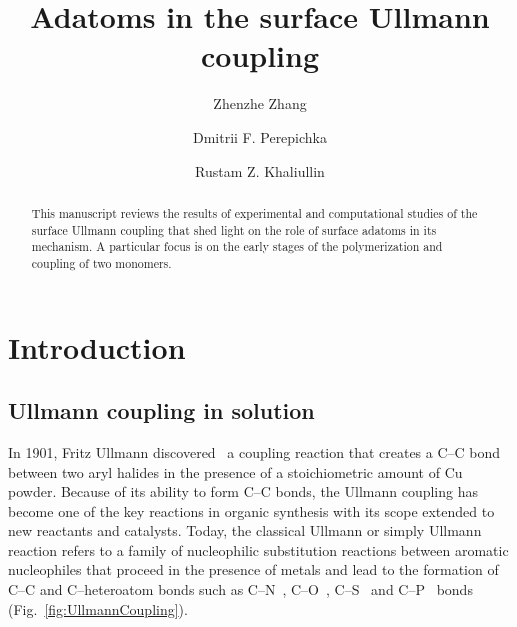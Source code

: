 \documentclass[%
 reprint,
 amsmath,amssymb,
 aps,
prb,
]{revtex4-2}
\begin{document}

\title{Adatoms in the surface Ullmann coupling}%

\author{Zhenzhe Zhang}
\author{Dmitrii F. Perepichka}%
\author{Rustam Z. Khaliullin}
%


\begin{abstract}
This manuscript reviews the results of experimental and computational studies of the surface Ullmann coupling that shed light on the role of surface adatoms in its mechanism. A particular focus is on the early stages of the polymerization and coupling of two monomers.
\end{abstract}

\maketitle


\section{Introduction}

\subsection{Ullmann coupling in solution}

In 1901, Fritz Ullmann discovered~\cite{ullmann_01} a coupling reaction that creates a C--C bond between two aryl halides in the presence of a stoichiometric amount of Cu powder. 
Because of its ability to form C--C bonds, the Ullmann coupling has become one of the key reactions in organic synthesis with its scope extended to new reactants and catalysts. 
Today, the classical Ullmann or simply Ullmann reaction refers to a family of nucleophilic substitution reactions between aromatic nucleophiles that proceed in the presence of metals and lead to the formation of C--C and C--heteroatom bonds such as C--N~\cite{ullmann_02, ullmann_03}, C--O~\cite{ullmann_04}, C--S~\cite{ullmann_05} and C--P~\cite{ullmann_21,ullmann_22} bonds (Fig.~\ref{fig:UllmannCoupling}). 
\end{document}
